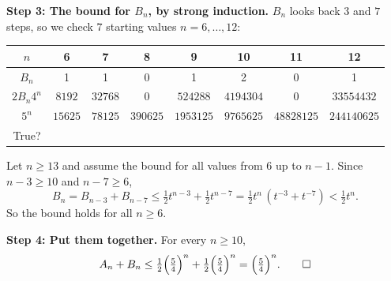 \documentclass[11pt,a4paper]{article}
\newcommand{\cmark}{\checkmark}
\newenvironment{notebox}{\par\begin{quote}\textit{Remark.}\ }{\end{quote}}
\theoremstyle{definition}
\begin{document}
\textbf{Step 3: The bound for $B_n$, by strong induction.}
$B_n$ looks back $3$ and $7$ steps, so we check $7$ starting values $n=6,\dots,12$:
\begin{center}\small
\begin{tabular}{@{}c|ccccccc@{}}
$n$ & 6 & 7 & 8 & 9 & 10 & 11 & 12\\\hline
$B_n$ & 1 & 1 & 0 & 1 & 2 & 0 & 1\\
$2B_n4^n$ & $8192$ & $32768$ & $0$ & $524288$ & $4194304$ & $0$ & $33554432$\\
$5^n$ & $15625$ & $78125$ & $390625$ & $1953125$ & $9765625$ & $48828125$ & $244140625$\\
True? & \cmark&\cmark&\cmark&\cmark&\cmark&\cmark&\cmark
\end{tabular}
\end{center}
Let $n\ge13$ and assume the bound for all values from $6$ up to $n-1$. Since $n-3\ge10$ and $n-7\ge6$,
\[
B_n=B_{n-3}+B_{n-7}\le\tfrac12t^{n-3}+\tfrac12t^{n-7}=\tfrac12t^n\,(t^{-3}+t^{-7})<\tfrac12t^n .
\]
So the bound holds for all $n\ge6$.

\textbf{Step 4: Put them together.} For every $n\ge10$,
\[
A_n+B_n\le\tfrac12\Big(\tfrac54\Big)^n+\tfrac12\Big(\tfrac54\Big)^n=\Big(\tfrac54\Big)^n. \qed
\]

\end{document}
